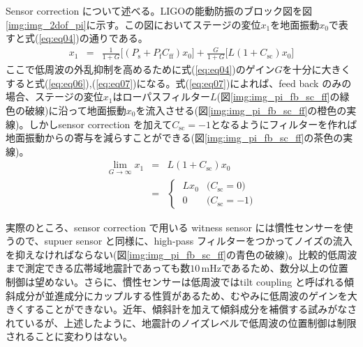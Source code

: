 \documentclass[a4paper,12pt]{jsarticle}
\begin{document}
Sensor correction について述べる。LIGOの能動防振のブロック図を図\ref{img:img_2dof_pi}に示す。この図においてステージの変位$x_1$を地面振動$x_0$で表すと式(\ref{eq:eq04})の通りである。
\begin{eqnarray} \label{eq:eq04}
  x_1 &=& \frac{1}{1+G}\Biggl[(P_{\mathrm{s}}+P_{\mathrm{f}}C_{\mathrm{ff}})x_0\Biggl]
  + \frac{G}{1+G}\Biggl[L(1+C_{\mathrm{sc}})x_0\Biggl]
\end{eqnarray}
ここで低周波の外乱抑制を高めるために式(\ref{eq:eq04})のゲイン$G$を十分に大きくすると式(\ref{eq:eq06}),(\ref{eq:eq07})になる。式(\ref{eq:eq07})によれば、feed back のみの場合、ステージの変位$x_1$はローパスフィルター$L$(図\ref{img:img_pi_fb_sc_ff}の緑色の破線)に沿って地面振動$x_0$を流入させる(図\ref{img:img_pi_fb_sc_ff}の橙色の実線)。しかしsensor correction を加えて$C_{\mathrm{sc}}=-1$となるようにフィルターを作れば地面振動からの寄与を減らすことができる(図\ref{img:img_pi_fb_sc_ff}の茶色の実線)。
\begin{eqnarray}\label{eq:eq06}
  \lim_{G \to \infty} x_{1} &=& L(1+C_{\mathrm{sc}})x_0 \\
  &=&
  \begin{cases}\label{eq:eq07}
    \; Lx_{0} & \text{($C_{\mathrm{sc}}=0$)}\\
    \; 0 & \text{($C_{\mathrm{sc}}=-1$)} 
  \end{cases}  
\end{eqnarray}

実際のところ、sensor correction で用いる witness sensor には慣性センサーを使うので、supuer sensor と同様に、high-pass フィルターをつかってノイズの流入を抑えなければならない(図\ref{img:img_pi_fb_sc_ff}の青色の破線)。比較的低周波まで測定できる広帯域地震計であっても数$10\,\mathrm{mHz}$であるため、数分以上の位置制御は望めない。さらに、慣性センサーは低周波ではtilt coupling と呼ばれる傾斜成分が並進成分にカップルする性質があるため、むやみに低周波のゲインを大きくすることができない。近年、傾斜計を加えて傾斜成分を補償する試み\cite{biscansD2018}がなされているが、上述したように、地震計のノイズレベルで低周波の位置制御は制限されることに変わりはない。
\end{document}
